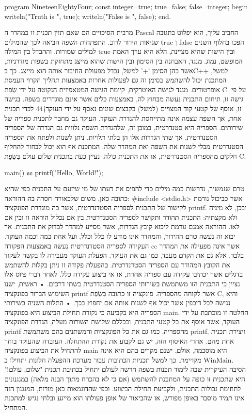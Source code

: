     
program NineteenEightyFour;
const
integer=true;
true=false;
false=integer;
begin
writeln("Truth is ", true);
writeln("False is ", false);
end.
    
מרבית הסיכויים הם שאם תזין תכנית זו במהדר ה Pascal החביב עליך, הוא יפלוט בתגובה
שגיאות הידור לרוב. התפתחות השפה הביאה לכך שהמילים true וְ false הפכו בחלוף השנים
למילים שמורות, וההבדל בין המילה true ובין הישות שהיא מציינת, הלא היא ערך האמת
המופשט, נמוג. מנגד, האבחנה בין הסימון ובין הישות שהוא מייצג מתחזקת בשפות
מודרניות, אשר בהן הסימן '+' למשל, נבדל מפעולת החיבור אותה הוא מייצג. כך בC++
למשל, המתכנת יכול להשתמש בסימן זה גם לפעולות אחרות באמצעות תהליך הקרוי העמסת
אופרטורים.
מנגד לגישה האוטרקית, קיימת הגישה המטאפיזית הנקוטה על ידי שְׂפַת C. על פי גישה זו,
תיחום התכנית נעשה מבחוץ לה, באמצעות כלים אשר אינם מוגדרים בשפה. בגישה זו, אוסף
של קטעי קוד המצויים (למשל) בקבצים שונים נאסף על ידי העוקד†{44} לכדי תכנית אחת,
אך השפה עצמה אינה מתייחסת להגדרת העוקד. העוקד גם מחבר לתכנית ספריה של שירותים.
הספריה היא סטנדרטית, במובן זה, שלהגדרת השפה נלווית גם הגדרה של הספריה
הסטנדרטית, אך שתי הגדרות אלו הן בלתי תלויות. ניתן לשנות ולפתח את הספריה
הסטנדרטית מבלי לשנות את השפה ואת המהדר שלה. המתכנת אף הוא יכול לבחור להחליף
חלקים מהספריה הסטנדרטית, או את התכנית כולה. נעיין כעת בתכנית שלום עולם בִּשְׂפַת C:

main() {¢¢
printf("Hello, World!\n");
}

טרם שנמשיך, נדרשות כמה מילים כדי להפיס את דעתו של מי שיזעם על התכנית כפי שהיא כתובה כאן, משום שלכאורה חסרה בה ההוראה:
#include <stdio.h>
אשר כביכול גורמת לקישור של התכנית לספריה הסטדנדרטית, אשר בה מוגדרת הפונקציה
printf. ובכן, לא מיניה ולא מקצתיה: התכנית תהודר ותקושר לספריה הסטנדרטית בין אם
נכלול הוראה זו ובין אם לאו. ההוראה אמנם גורמת ליבוא קובץ הגדרות, אשר מסייע
למהדר לבדוק את התכנית. אך יבוא זה נעשה טרם ההידור, והמהדר אינו מודע לו כלל
וכלל, ועל אחת כמה וכמה העוקד. העקידה לספריה הסטדנדרטית נעשה באמצעות הפקודה cc
אשר אינה מפעילה את המהדר בלבד, אלא גם את הקדם מעבד, כמו גם את העוקד. הפעלת
העוקד מעבירה לו בקשה לעקוד את הקובץ המהודר עם הספריה הסטדנדרטית. בהפעלת פקודה
זו ניתן בקלות להשתמש בדגלים אשר יכתיבו עקידה עם ספריה אחרת, או אי ביצוע עקידה
כלל.
לאחר דברי פיוס אלו נציין כי התכנית הזו משתמשת בשירותי הספריה הסטנדרטית בשתי דרכים.
    • ראשית, ישנו השימוש הברור בפונקציה printf אשר לקוחה מהספריה. פונקציה זו כתובה בִּשְׂפַת C, והיא נגישה לכל דיכפין אשר יכול אף לשנות אותה אם יחפוץ בכך.
    • התלות השניה בשירותי הספריה היא בקביעה כי נקודת תחילת הביצוע היא בפונקציה main. החלטה זו מוכתבת על ידי העוקד, אשר אוסף את כל קטעי התכנית, ובכללם שלושת השורות מעלה, הגדרת הפונקציה printf מהספריה, כמו גם את כל הפונקציות והמשתנים בהם משתמשת printf, ויצירת תכנית אחת מהם. אחרי האיסוף הזה, יש גם לקבוע את נקודת ההתחלה.
        העובדה שהעוקד בוחר להתחיל את הביצוע בפונקציה main היא מוסכמה, אולם, ישנם מקרים בהם היא אינה מקויימת. כך למשל תכניות הכתובות עבור מערכת ההפעלה חלונות יתחילו ב WinMain.
        הסיבה העיקרית שבה לימוד תכנות בשפה חדשה לעולם יתחיל בכתיבת תכנית "שלום, עולם!" היא שתכנית זו כופה על המתכנת להשתמש (אם כי לא בהכרח מתוך הבנה מלאה) במנגנונים לתחימת גבולות התכנית, ולקביעת תחילת הביצוע. וכפי שהדוגמאות כאן מורות, המנגנון הזה אינו תמיד מוסבר באופן מפורש, או שהביאור של אופן פעולתו הוא מייגע ובלתי נגיש למתכנת המתחיל.
    
